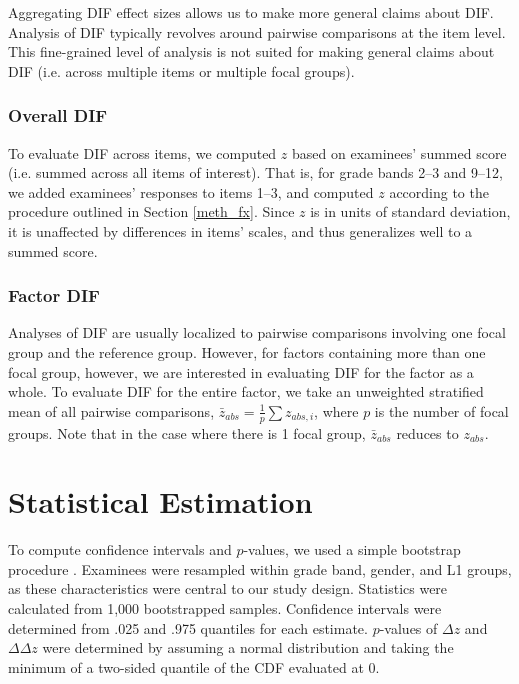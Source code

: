 \documentclass [PhD] {uclathes}
\begin{document}
Aggregating DIF effect sizes allows us to make more general claims about DIF. Analysis of DIF typically revolves around pairwise comparisons at the item level. This fine-grained level of analysis is not suited for making general claims about DIF (i.e. across multiple items or multiple focal groups).

\subsubsection{Overall DIF}

To evaluate DIF across items, we computed $z$ based on examinees’ summed score (i.e. summed across all items of interest). That is, for grade bands 2–3 and 9–12, we added examinees’ responses to items 1–3, and computed $z$ according to the procedure outlined in Section \ref{meth_fx}. Since $z$ is in units of standard deviation, it is unaffected by differences in items’ scales, and thus generalizes well to a summed score.

\subsubsection{Factor DIF}

Analyses of DIF are usually localized to pairwise comparisons involving one focal group and the reference group. However, for factors containing more than one focal group, however, we are interested in evaluating DIF for the factor as a whole. To evaluate DIF for the entire factor, we take an unweighted stratified mean of all pairwise comparisons, $\bar{z}_{abs} = \frac{1}{p} \sum{z_{abs,i}}$, where $p$ is the number of focal groups. Note that in the case where there is 1 focal group, $\bar{z}_{abs}$ reduces to $z_{abs}$.

\section{Statistical Estimation}
\label{meth_boot}

To compute confidence intervals and $p$-values, we used a simple bootstrap procedure \citep{efron1994}. Examinees were resampled within grade band, gender, and L1 groups, as these characteristics were central to our study design. Statistics were calculated from 1,000 bootstrapped samples. Confidence intervals were determined from .025 and .975 quantiles for each estimate. $p$-values of $\Delta z$ and $\Delta \Delta z$ were determined by assuming a normal distribution and taking the minimum of a two-sided quantile of the CDF evaluated at 0. 
\end{document}
